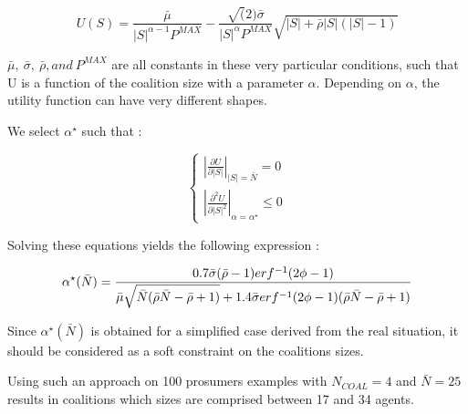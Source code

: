 \documentclass[journal]{IEEEtran}
\begin{document}
\begin{equation}
	U(S) = \frac{ \bar{ \mu } }{ |S|^{\alpha -1} P^{MAX} } - \frac{ \sqrt(2) \bar{ \sigma } }{ |S|^{\alpha} P^{MAX} } \sqrt{|S| + \bar{ \rho } |S| ( |S| - 1 ) }
\end{equation}


\noindent $ \bar{ \mu },\ \bar{ \sigma },\ \bar{ \rho }, and\ P^{MAX} $ are all constants in these very particular conditions, such that U is a function of the coalition size with a parameter $ \alpha $. Depending on $ \alpha $, the utility function can have very different shapes.

\noindent We select $\alpha^{\star} $ such that :


\begin{equation}
	\left\{ \begin{array}{lll} \left| \frac{ \partial U }{ \partial |S| } \right|_{|S|=\bar{N}} = 0 \\ \left| \frac{ \partial^2 U }{ \partial |S|^2 } \right|_{\alpha = \alpha^{\star}} \leq 0 \end{array} \right.
\end{equation}


\noindent Solving these equations yields the following expression :


\begin{equation}
	\begin{tiny}
		\alpha^{\star} ( \bar{N} ) = \dfrac{0.7 \bar{\sigma}(\bar{\rho}-1)erf^{-1}(2 \phi - 1)}{\bar{\mu}\sqrt{\bar{N}(\bar{\rho}\bar{N}-\bar{\rho}+1)}+1.4 \bar{\sigma} erf^{-1} (2 \phi -1 ) (\bar{\rho}\bar{N}-\bar{\rho} + 1)} 
	\end{tiny}
\end{equation}


Since $ \alpha^{\star} ( \bar{N} ) $ is obtained for a simplified case derived from the real situation, it should be considered as a soft constraint on the coalitions sizes.

Using such an approach on 100 prosumers examples with $N_{COAL} = 4 $ and $\bar{N}=25$ results in coalitions which sizes are comprised between 17 and 34 agents.


  

\end{document}
